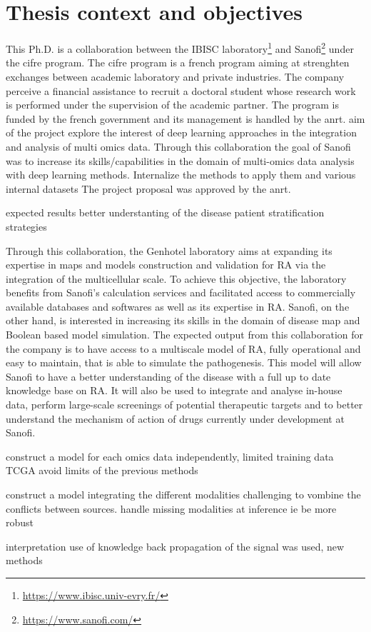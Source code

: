 \documentclass[../main.tex]{subfiles}
\begin{document}
\section{Thesis context and objectives}
 This Ph.D. is a collaboration between the IBISC laboratory\footnote{\url{https://www.ibisc.univ-evry.fr/}} and Sanofi\footnote{\url{https://www.sanofi.com/}} under the \gls{cifre} program.
 The \gls{cifre} program is a french program aiming at strenghten exchanges between academic laboratory and private industries.  
 The company perceive a financial assistance to recruit a doctoral student whose research work is performed under the supervision of the academic partner.
 The program is funded by the french government and its management is handled by the \gls{anrt}.
 aim of the project explore the interest of deep learning approaches in the integration and analysis of multi omics data. 
 Through this collaboration the goal of Sanofi was to increase its skills/capabilities in the domain of multi-omics data analysis with deep learning methods.
 Internalize the methods to apply them and various internal datasets
 The project proposal was approved by the \gls{anrt}. 

 expected results
 better understanting of the disease
 patient stratification strategies

 Through this collaboration, the Genhotel laboratory aims at expanding its expertise in maps and models construction and validation for RA via the integration of
the multicellular scale. To achieve this objective, the laboratory benefits from
Sanofi’s calculation services and facilitated access to commercially available databases and softwares as well as its expertise in RA.
Sanofi, on the other hand, is interested in increasing its skills in the domain of
disease map and Boolean based model simulation. The expected output from this
collaboration for the company is to have access to a multiscale model of RA, fully
operational and easy to maintain, that is able to simulate the pathogenesis. This
model will allow Sanofi to have a better understanding of the disease with a full
up to date knowledge base on RA. It will also be used to integrate and analyse
in-house data, perform large-scale screenings of potential therapeutic targets
and to better understand the mechanism of action of drugs currently under development at Sanofi. 
 

 \begin{description}[
		 style=multiline,
		 leftmargin=!,
		 labelwidth=\eqboxwidth{listlabel@\EnumitemId}, format=\mylabelformat
	 ]
	 \item[First objective] construct a model for each omics data independently, limited training data TCGA
	 avoid limits of the previous methods 
	 \item[Second objective] construct a model integrating the different modalities 
	 challenging to vombine the conflicts between sources. handle missing modalities at inference ie be more robust
	 \item[Third objective] interpretation use of knowledge back propagation of the signal was used, new methods 
 \end{description}
\end{document}
